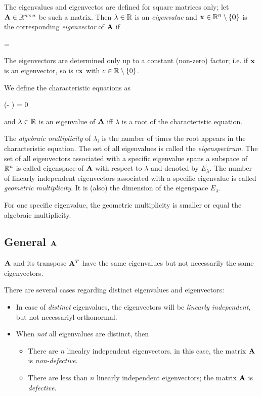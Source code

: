 
The eigenvalues and eigenvectos are defined for square matrices only; let $\mathbf{A} \in \mathbb{R}^{n \times n}$ be such a matrix. Then $\lambda \in \mathbb{R}$ is an \emph{eigenvalue} and $\mathbf{x} \in \mathbb{R}^n \setminus \{\mathbf{0}\}$ is the corresponding \emph{eigenvector} of $\mathbf{A}$ if

\bee
\Abf \xbf = \lambda \xbf
\eee

The eigenvectors are determined only up to a constant (non-zero) factor; i.e. if $\mathbf{x}$ is an eigenvector, so is $c \mathbf{x}$ with $c \in \mathbb{R} \setminus\{0\}$.

We define the characteristic equations as

\bee
\det (\Abf - \lambda \xbf) = 0
\eee

and $\lambda \in \mathbb{R}$ is an eigenvalue of $\mathbf{A}$ iff $\lambda$ is a root of the characteristic equation.

The \emph{algebraic multiplicity} of $\lambda_i$ is the number of times the root appears in the characteristic equation. The set of all eigenvalues is called the \emph{eigenspectrum}. The set of all eigenvectors associated with a specific eigenvalue spans a subspace of $\mathbb{R}^n$ is called eigenspace of $\mathbf{A}$ with respect to $\lambda$ and denoted by $E_\lambda$. The number of linearly independent eigenvectors associated with a specific eigenvalue is called \emph{geometric multiplicity}. It is (also) the dimension of the eigenspace $E_\lambda$.

For one specific eigenvalue, the geometric multiplicity is smaller or equal the algebraic multiplicity.


\subsection{General $\mathbf{A}$}

$\mathbf{A}$ and its transpose $\mathbf{A}^T$ have the same eigenvalues but not necessarily the same eigenvectors.

There are several cases regarding distinct eigenvalues and eigenvectors:

\begin{itemize}

  \item In case of \emph{distinct} eigenvalues, the eigenvectors will be \emph{linearly independent}, but not necessariyl orthonormal.

  \item When \emph{not} all eigenvalues are distinct, then

    \begin{itemize}

    \item There are $n$ linealry independent eigenvectors. in this case, the matrix $\mathbf{A}$ is \emph{non-defective}.

    \item There are less than $n$ linearly independent eigenvectors; the matrix $\mathbf{A}$ is \emph{defective}. 

    \end{itemize}

\end{itemize}

